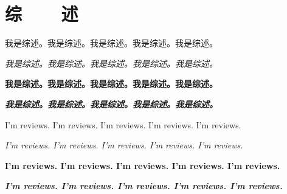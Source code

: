 \chapter{综~~~~述}

\reTitle



我是综述。我是综述。我是综述。我是综述。我是综述。
\par
\textit{我是综述。我是综述。我是综述。我是综述。我是综述。}
\par
\textbf{我是综述。我是综述。我是综述。我是综述。我是综述。}
\par
\textbf{\textit{我是综述。我是综述。我是综述。我是综述。我是综述。}}
\par
I'm reviews. I'm reviews. I'm reviews. I'm reviews. I'm reviews.
\par
\textit{I'm reviews. I'm reviews. I'm reviews. I'm reviews. I'm reviews.}
\par
\textbf{I'm reviews. I'm reviews. I'm reviews. I'm reviews. I'm reviews.}
\par
\textbf{\textit{I'm reviews. I'm reviews. I'm reviews. I'm reviews. I'm reviews.}} 

\cite{DPMG,cnproceed}

\clearpage




